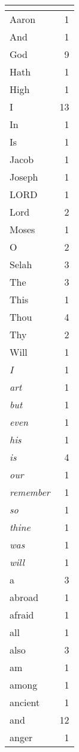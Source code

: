 \begin{center}
\begin{longtable}{l|r}
\hline \multicolumn{2}{c}{{ }} \\ \hline
\endfoot 
Aaron & 1\\ \hline 
And & 1\\ \hline 
God & 9\\ \hline 
Hath & 1\\ \hline 
High & 1\\ \hline 
I & 13\\ \hline 
In & 1\\ \hline 
Is & 1\\ \hline 
Jacob & 1\\ \hline 
Joseph & 1\\ \hline 
LORD & 1\\ \hline 
Lord & 2\\ \hline 
Moses & 1\\ \hline 
O & 2\\ \hline 
Selah & 3\\ \hline 
The & 3\\ \hline 
This & 1\\ \hline 
Thou & 4\\ \hline 
Thy & 2\\ \hline 
Will & 1\\ \hline 
\emph{I} & 1\\ \hline 
\emph{art} & 1\\ \hline 
\emph{but} & 1\\ \hline 
\emph{even} & 1\\ \hline 
\emph{his} & 1\\ \hline 
\emph{is} & 4\\ \hline 
\emph{our} & 1\\ \hline 
\emph{remember} & 1\\ \hline 
\emph{so} & 1\\ \hline 
\emph{thine} & 1\\ \hline 
\emph{was} & 1\\ \hline 
\emph{will} & 1\\ \hline 
a & 3\\ \hline 
abroad & 1\\ \hline 
afraid & 1\\ \hline 
all & 1\\ \hline 
also & 3\\ \hline 
am & 1\\ \hline 
among & 1\\ \hline 
ancient & 1\\ \hline 
and & 12\\ \hline 
anger & 1\\ \hline 

\end{longtable}
\end{center}
